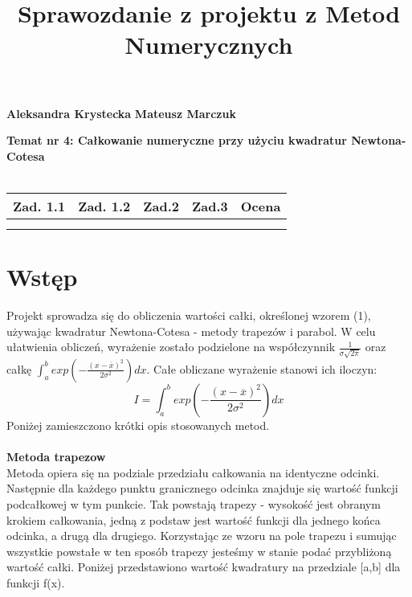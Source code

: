 \documentclass{article}
\title{Sprawozdanie z projektu z Metod Numerycznych}
\begin{document}
		\maketitle	
	
	\pagestyle{fancy}
	\textbf {Aleksandra Krystecka} \newline
	\textbf {Mateusz Marczuk} \newline

	\textbf{Temat nr 4: Całkowanie numeryczne przy użyciu kwadratur Newtona-Cotesa}\\\\

	\begin{center}
		
		\begin{tabular}{|c|c|c|c|c|}
			\hline
			Zad. 1.1 & Zad. 1.2 &  Zad.2 & Zad.3 & Ocena\\\hline
			 & & & & \\
			 & & & & \\\hline
		\end{tabular}

	\end{center}
	\section{Wstęp}
	Projekt sprowadza się do obliczenia wartości całki, określonej wzorem (1), używając kwadratur Newtona-Cotesa - metody trapezów i parabol. W celu ułatwienia obliczeń, wyrażenie zostało podzielone na współczynnik $\frac{1}{\sigma\sqrt{2\pi}}$ oraz całkę $ \int_{a}^{b} exp  \left( - \frac{(x-\overline{x})^2}{2\sigma^2}   \right) dx$. Całe obliczane wyrażenie stanowi ich iloczyn:
		\begin{equation}
			I = \int_{a}^{b} exp  \left( - \frac{(x-\overline{x})^2}{2\sigma^2}   \right) dx
		\end{equation}
	Poniżej zamieszczono krótki opis stosowanych metod.
	\\\\
	\textbf {Metoda trapezow }
	\\ 
	Metoda opiera się na podziale przedziału całkowania na identyczne odcinki. Następnie dla każdego punktu granicznego odcinka znajduje się wartość funkcji podcałkowej w tym punkcie. Tak powstają trapezy - wysokość jest obranym krokiem całkowania, jedną z podstaw jest wartość funkcji dla jednego końca odcinka, a drugą dla drugiego. Korzystając ze wzoru na pole trapezu i sumując wszystkie powstałe w ten sposób trapezy jesteśmy w stanie podać przybliżoną wartość całki. Poniżej przedstawiono wartość kwadratury na przedziale [a,b] dla funkcji f(x).
	
\end{document}
